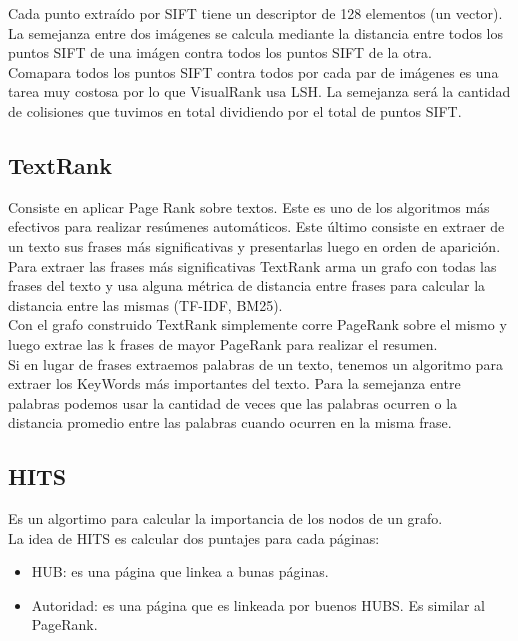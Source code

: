 \documentclass[titlepage,a4paper]{article}
\begin{document}
Cada punto extraído por SIFT tiene un descriptor de 128 elementos (un vector). La semejanza entre dos imágenes se calcula mediante la distancia entre todos los puntos SIFT de una imágen contra todos los puntos SIFT de la otra. \\

Comapara todos los puntos SIFT contra todos por cada par de imágenes es una tarea muy costosa por lo que VisualRank usa LSH. La semejanza será la cantidad de colisiones que tuvimos en total dividiendo por el total de puntos SIFT. 

\subsection*{TextRank}
Consiste en aplicar Page Rank sobre textos. Este es uno de los algoritmos más efectivos para realizar resúmenes automáticos. Este último consiste en extraer  de un texto sus frases más significativas y presentarlas luego en orden de aparición. \\

Para extraer las frases más significativas TextRank arma un grafo con todas las frases del texto y usa alguna métrica de distancia entre frases para calcular la distancia entre las mismas (TF-IDF, BM25). \\

Con el grafo construido TextRank simplemente corre PageRank sobre el mismo y luego extrae las k frases de mayor PageRank para realizar el resumen. \\

Si en lugar de frases extraemos palabras de un texto, tenemos un algoritmo para extraer los KeyWords más importantes del texto. Para la semejanza entre palabras podemos usar la cantidad de veces que las palabras ocurren o la distancia promedio entre las palabras cuando ocurren en la misma frase. 

\subsection*{HITS}
Es un algortimo para calcular la importancia de los nodos de un grafo. \\ 

La idea de HITS es calcular dos puntajes para cada páginas: 
\begin{itemize}
\item HUB:  es una página que linkea a bunas páginas. 
\item Autoridad: es una página que es linkeada por buenos HUBS. Es similar al PageRank. 
\end{itemize}
\end{document}
